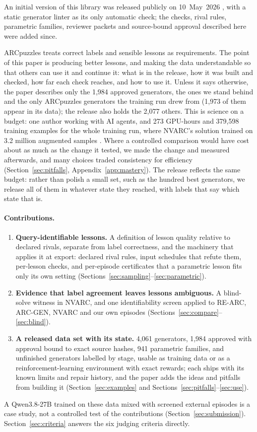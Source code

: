 \documentclass[11pt]{article}
\begin{document}
An initial version of this library was released publicly on 10~May~2026
\cite{v01}, with a static generator linter as its only automatic check; the
checks, rival rules, parametric families, reviewer packets and source-bound
approval described here were added since.

ARCpuzzles treats correct labels and sensible lessons as requirements. The point of this paper is
producing better lessons, and making the data understandable so that others can
use it and continue it: what
is in the release, how it was built and checked, how far each check reaches, and
how to use it. Unless it says otherwise, the paper describes only the 1,984
approved generators, the ones we stand behind and the only ARCpuzzles generators
the training run drew from (1,973 of them appear in its data); the release also
holds the 2,077 others. This is science on a budget: one author working with AI
agents, and 273 GPU-hours and 379,598 training examples for the whole training
run, where NVARC's solution trained on 3.2 million augmented samples
\cite{nvarc}. Where a controlled comparison
would have cost about as much as the change it tested, we made the change and
measured afterwards, and many choices traded consistency for efficiency
(Section~\ref{sec:pitfalls}, Appendix~\ref{app:mastery}). The release
reflects the same budget: rather than polish a small set, such as the hundred
best generators, we release all of them in whatever state they reached, with
labels that say which state that is.

\paragraph{Contributions.}
\begin{enumerate}[nosep]
  \item \textbf{Query-identifiable lessons.} A definition of lesson quality
  relative to declared rivals, separate from label correctness, and the
  machinery that applies it at export: declared rival rules, input schedules
  that refute them, per-lesson checks, and per-episode certificates that a
  parametric lesson fits only its own setting
  (Sections~\ref{sec:sampling}--\ref{sec:parametric}).
  \item \textbf{Evidence that label agreement leaves lessons ambiguous.} A
  blind-solve witness in NVARC, and one identifiability screen applied to
  RE-ARC, ARC-GEN, NVARC and our own episodes
  (Sections~\ref{sec:compare}--\ref{sec:blind}).
  \item \textbf{A released data set with its state.} 4,061 generators, 1,984
  approved with approval bound to exact source hashes, 941 parametric families,
  and unfinished generators labelled by stage, usable as training data or as a
  reinforcement-learning environment with exact rewards; each ships with its
  known limits and repair history, and the paper adds the ideas and pitfalls
  from building it (Section~\ref{sec:examples} and
  Sections~\ref{sec:pitfalls}--\ref{sec:use}).
\end{enumerate}
A Qwen3.8-27B trained on these data mixed with screened external episodes is a
case study, not a controlled test of the contributions
(Section~\ref{sec:submission}). Section~\ref{sec:criteria} answers the six
judging criteria directly.
\end{document}
